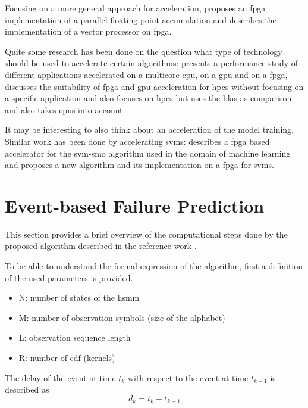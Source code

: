 \documentclass[mscthesis]{usiinfthesis}
\begin{document}
Focusing on a more general approach for acceleration, \cite{ARITH13_Kadric}
proposes an \gls{fpga} implementation of a parallel floating point accumulation
and \cite{ITNG07_Yang} describes the implementation of a vector processor on
\gls{fpga}.

Quite some research has been done on the question what type of technology
should be used to accelerate certain algorithms: \cite{SASP08_Che} presents
a performance study of different applications accelerated on a multicore
\gls{cpu}, on a \gls{gpu} and on a \gls{fpga}, \cite{FPL10_Jones} discusses the
suitability of \gls{fpga} and \gls{gpu} acceleration for \gls{hpcs} without
focusing on a specific application and \cite{ISVLSI10_Kestur} also focuses on
\gls{hpcs} but uses the \gls{blas} as comparison and also takes \glspl{cpu}
into account.

It may be interesting to also think about an acceleration of the model
training. Similar work has been done by accelerating \glspl{svm}:
\cite{FCCM09_Cadambi} describes a \gls{fpga} based accelerator for the
\gls{svm}-\gls{smo} algorithm used in the domain of machine learning and
\cite{IEEE03_Anguita} proposes a new algorithm and its implementation on
a \gls{fpga} for \glspl{svm}.

\chapter{Event-based Failure Prediction}
\label{ch:event}
\glsresetall %

This section provides a brief overview of the computational steps done by the
proposed algorithm described in the reference work \cite{salfner08}.

To be able to understand the formal expression of the algorithm, first
a definition of the used parameters is provided.
\begin{itemize}
    \item N: number of states of the \gls{hsmm}
    \item M: number of observation symbols (size of the alphabet)
    \item L: observation sequence length
    \item R: number of \gls{cdf} (kernels)
\end{itemize}
The delay of the event at time $ t_k $ with respect to the event at time
$ t_{k-1} $ is described as
\begin{equation}
\label{eq:delay}
    d_k = t_k-t_{k-1}
\end{equation}
\end{document}
